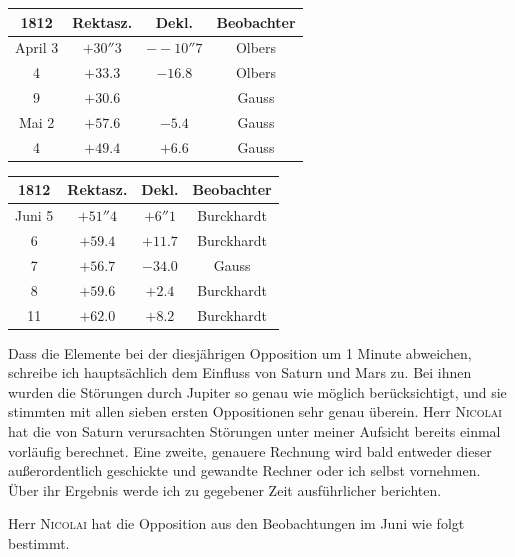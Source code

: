 \begin{center}\fontsize{10}{12}\selectfont\setlength{\tabcolsep}{6pt}\renewcommand{\arraystretch}{1.15}\begin{tabular}{c|c|c|c}
1812 & Rektasz. & Dekl. & Beobachter\\\hline
April 3 & $+30''3$ & $-\!-10''7$ & Olbers\\
4 & $+33.3$ & $-16.8$ & Olbers\\
9 & $+30.6$ &  & Gauss\\
Mai 2 & $+57.6$ & $-5.4$ & Gauss\\
4 & $+49.4$ & $+6.6$ & Gauss\\
\end{tabular}\end{center}
\begin{center}\fontsize{10}{12}\selectfont\setlength{\tabcolsep}{6pt}\renewcommand{\arraystretch}{1.15}\begin{tabular}{c|c|c|c}
1812 & Rektasz. & Dekl. & Beobachter\\\hline
Juni 5 & $+51''4$ & $+6''1$ & Burckhardt\\
6 & $+59.4$ & $+11.7$ & Burckhardt\\
7 & $+56.7$ & $-34.0$ & Gauss\\
8 & $+59.6$ & $+2.4$ & Burckhardt\\
11 & $+62.0$ & $+8.2$ & Burckhardt\\
\end{tabular}\end{center}

\par\indent Dass die Elemente bei der diesjährigen Opposition um 1 Minute abweichen, schreibe ich hauptsächlich dem Einfluss von Saturn und Mars zu. Bei ihnen wurden die Störungen durch Jupiter so genau wie möglich berücksichtigt, und sie stimmten mit allen sieben ersten Oppositionen sehr genau überein. Herr \textsc{Nicolai} hat die von Saturn verursachten Störungen unter meiner Aufsicht bereits einmal vorläufig berechnet. Eine zweite, genauere Rechnung wird bald entweder dieser außerordentlich geschickte und gewandte Rechner oder ich selbst vornehmen. Über ihr Ergebnis werde ich zu gegebener Zeit ausführlicher berichten.

\par\indent Herr \textsc{Nicolai} hat die Opposition aus den Beobachtungen im Juni wie folgt bestimmt.

